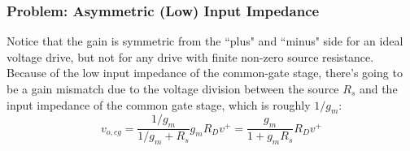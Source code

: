 \subsubsection{Problem:  Asymmetric (Low) Input Impedance}
Notice that the gain is symmetric from the ``plus" and ``minus" side for an ideal voltage drive, but not for any drive with finite non-zero source resistance.  Because of the low input impedance of the common-gate stage, there's going to be a gain mismatch due to the voltage division between the source $R_s$ and the input impedance of the common gate stage, which is roughly $1/g_m$:
    \begin{equation}
        v_{o,cg} = \frac{1/g_m}{1/g_m + R_s} g_m R_D  v^+ = \frac{g_m}{1 + g_m R_s}  R_D  v^+
    \end{equation} 
